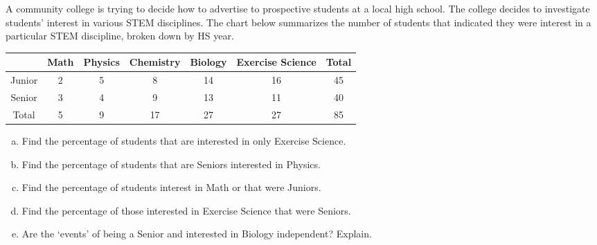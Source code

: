 \documentclass[11pt,letterpaper]{article}
\begin{document}

 A community college is trying to decide how to advertise to prospective students at a local high school. The college decides to investigate students' interest in various STEM disciplines. The chart below summarizes the number of students that indicated they were interest in a particular STEM discipline, broken down by HS year. \par
	\begin{table}[H]
	\centering
	\begin{tabular}{|c||ccccc||c|} \hline
	& Math & Physics & Chemistry & Biology & Exercise Science & Total \\ \hline
	Junior & 2 & 5 & 8 & 14 & 16 & 45 \\ 
	Senior & 3 & 4 & 9 & 13 & 11 & 40 \\ \hline
	Total & 5 & 9 & 17 & 27 & 27 & 85 \\ \hline
	\end{tabular}
	\end{table} 

\begin{enumerate}[(a)]
\item Find the percentage of students that are interested in only Exercise Science. 
\item Find the percentage of students that are Seniors interested in Physics. 
\item Find the percentage of students interest in Math or that were Juniors. 
\item Find the percentage of those interested in Exercise Science that were Seniors. 
\item Are the `events' of being a Senior and interested in Biology independent? Explain. 
\end{enumerate} \pspace
\end{document}
